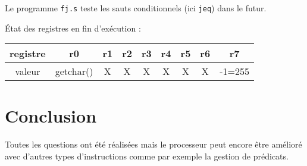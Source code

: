\documentclass[twoside, 12pt, a4paper]{article}
\begin{document}
Le programme \texttt{fj.s} teste les sauts conditionnels (ici \texttt{jeq}) dans le futur.

État des registres en fin d'exécution :
\begin{center}
    \ttfamily
        \begin{tabular}{|c|c|c|c|c|c|c|c|c|} 
         \hline
         registre & r0 & r1 & r2 & r3 & r4 & r5 & r6 & r7 \\
         \hline
         valeur   & getchar()  & X  & X  &  X & X  & X  &  X & -1=255\\
         \hline
    \end{tabular}
\end{center}

\clearpage

\section*{Conclusion}

Toutes les questions ont été réalisées mais le processeur peut encore être amélioré avec d'autres types d'instructions comme par exemple la gestion de prédicats.
\end{document}
